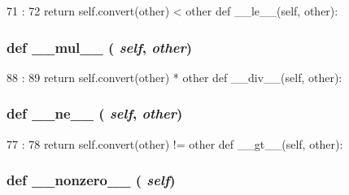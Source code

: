 \begin{DoxyCode}
71                            :
72         return self.convert(other) < other
    def __le__(self, other):
\end{DoxyCode}
\hypertarget{classm5_1_1util_1_1smartdict_1_1Variable_a48a7267a9f9d29d1514e713744202146}{
\subsubsection[{\_\-\_\-mul\_\-\_\-}]{\setlength{\rightskip}{0pt plus 5cm}def \_\-\_\-mul\_\-\_\- ( {\em self}, \/   {\em other})}}
\label{classm5_1_1util_1_1smartdict_1_1Variable_a48a7267a9f9d29d1514e713744202146}



\begin{DoxyCode}
88                             :
89         return self.convert(other) * other
    def __div__(self, other):
\end{DoxyCode}
\hypertarget{classm5_1_1util_1_1smartdict_1_1Variable_ad69df72a6bf0be3525fe45cd2f77f343}{
\subsubsection[{\_\-\_\-ne\_\-\_\-}]{\setlength{\rightskip}{0pt plus 5cm}def \_\-\_\-ne\_\-\_\- ( {\em self}, \/   {\em other})}}
\label{classm5_1_1util_1_1smartdict_1_1Variable_ad69df72a6bf0be3525fe45cd2f77f343}



\begin{DoxyCode}
77                            :
78         return self.convert(other) != other
    def __gt__(self, other):
\end{DoxyCode}
\hypertarget{classm5_1_1util_1_1smartdict_1_1Variable_a14f4a7f4cbfde7254adc73da3b2de9a5}{
\subsubsection[{\_\-\_\-nonzero\_\-\_\-}]{\setlength{\rightskip}{0pt plus 5cm}def \_\-\_\-nonzero\_\-\_\- ( {\em self})}}
\label{classm5_1_1util_1_1smartdict_1_1Variable_a14f4a7f4cbfde7254adc73da3b2de9a5}



